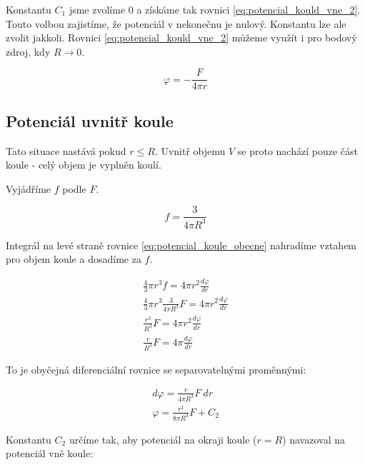 \documentclass{book}
\begin{document}
Konstantu \(C_1\) jsme zvolíme 0 a získáme tak rovnici \eqref{eq:potencial_kould_vne_2}. Touto volbou zajistíme, že potenciál v nekonečnu je nulový. Konstantu lze ale zvolit jakkoli. Rovnici \eqref{eq:potencial_kould_vne_2} můžeme využít i pro bodový zdroj, kdy \(R \rightarrow 0\).

\begin{equation}
\label{eq:potencial_koule_vne_2}
\varphi = -\frac{F}{4 \pi r}
\end{equation}

\subsection{Potenciál uvnitř koule}

Tato situace nastává pokud \(r \leq R\). Uvnitř objemu \(V\) se proto nachází pouze část koule - celý objem je vyplněn koulí.

Vyjádříme \(f\) podle \(F\).

\begin{equation}
f = \frac{3}{4 \pi R^3}
\end{equation}

Integrál na levé straně rovnice \eqref{eq:potencial_koule_obecne} nahradíme vztahem pro objem koule a dosadíme za \(f\).

\begin{equation}
\begin{split}
\frac{4}{3} \pi r^3 f = 4 \pi r^2 \frac{d \varphi}{dr} \\
\frac{4}{3} \pi r^3 \frac{3}{4 \pi R^3} F = 4 \pi r^2 \frac{d \varphi}{dr} \\
\frac{r^3}{R^3} F = 4 \pi r^2 \frac{d \varphi}{dr} \\
\frac{r}{R^3} F = 4 \pi \frac{d \varphi}{dr}
\end{split}
\end{equation}

To je obyčejná diferenciální rovnice se separovatelnými proměnnými:

\begin{equation}
\label{eq:potencial_disku_uvnitr}
\begin{split}
d \varphi = \frac{r}{4 \pi R^3} F \ dr \\
\varphi = \frac{r^2}{8 \pi R^3} F + C_2
\end{split}
\end{equation}

Konstantu \(C_2\) určíme tak, aby potenciál na okraji koule (\(r = R\)) navazoval na potenciál vně koule:
\end{document}
